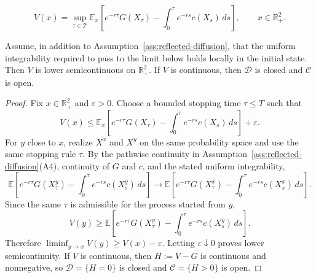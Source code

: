 \documentclass[10pt,a4paper]{amsart}
\newcommand{\R}{\mathbb{R}}
\begin{document}
\begin{equation}
\label{eq:value-function}
   V(x)
   =
   \sup_{\tau\in\mathcal T}
   \mathbb E_x\left[
      e^{-r\tau}G(X_\tau)
      -
      \int_0^\tau e^{-rs}c(X_s)\,ds
   \right],
   \qquad x\in\R^2_+.
\end{equation}

\begin{lemma}
\label{lem:value-lsc}
Assume, in addition to Assumption~\ref{ass:reflected-diffusion}, that the
uniform integrability required to pass to the limit below holds locally in the
initial state. Then $V$ is lower semicontinuous on $\R^2_+$. If $V$ is
continuous, then $\mathcal D$ is closed and $\mathcal C$ is open.
\end{lemma}

\begin{proof}
Fix $x\in\R^2_+$ and $\varepsilon>0$. Choose a bounded stopping time
$\tau\le T$ such that
\[
   V(x)
   \le
   \mathbb E_x\left[
      e^{-r\tau}G(X_\tau)
      -
      \int_0^\tau e^{-rs}c(X_s)\,ds
   \right]
   +\varepsilon.
\]
For $y$ close to $x$, realize $X^x$ and $X^y$ on the same probability space
and use the same stopping rule $\tau$. By the pathwise continuity in
Assumption~\ref{ass:reflected-diffusion}\textup{(A4)}, continuity of $G$ and
$c$, and the stated uniform integrability,
\[
   \mathbb E\left[
      e^{-r\tau}G(X_\tau^y)
      -\int_0^\tau e^{-rs}c(X_s^y)\,ds
   \right]
   \longrightarrow
   \mathbb E\left[
      e^{-r\tau}G(X_\tau^x)
      -\int_0^\tau e^{-rs}c(X_s^x)\,ds
   \right].
\]
Since the same $\tau$ is admissible for the process started from $y$,
\[
   V(y)
   \ge
   \mathbb E\left[
      e^{-r\tau}G(X_\tau^y)
      -\int_0^\tau e^{-rs}c(X_s^y)\,ds
   \right].
\]
Therefore $\liminf_{y\to x}V(y)\ge V(x)-\varepsilon$. Letting
$\varepsilon\downarrow0$ proves lower semicontinuity. If $V$ is continuous,
then $H:=V-G$ is continuous and nonnegative, so $\mathcal D=\{H=0\}$ is closed
and $\mathcal C=\{H>0\}$ is open.
\end{proof}
\end{document}
